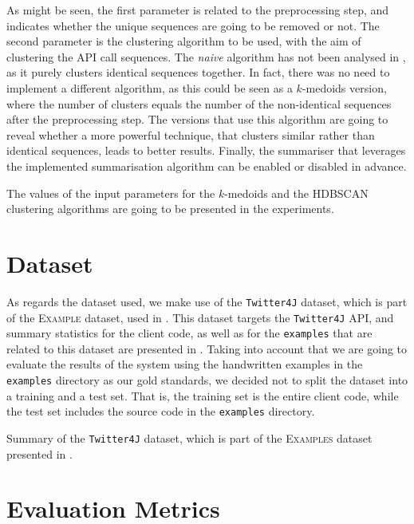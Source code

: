 As might be seen, the first parameter is related to the preprocessing step, and indicates whether the unique sequences are going to be removed or not. The second parameter is the clustering algorithm to be used, with the aim of clustering the API call sequences. The \textit{naive} algorithm has not been analysed in , as it purely clusters identical sequences together. In fact, there was no need to implement a different algorithm, as this could be seen as a $k$-medoids version, where the number of clusters equals the number of the non-identical sequences after the preprocessing step. The versions that use this algorithm are going to reveal whether a more powerful technique, that clusters similar rather than identical sequences, leads to better results. Finally, the summariser that leverages the implemented summarisation algorithm can be enabled or disabled in advance.

The values of the input parameters for the $k$-medoids and the HDBSCAN clustering algorithms are going to be presented in the experiments.


\section{Dataset}
\label{sec:evaluation-dataset}

As regards the dataset used, we make use of the \texttt{Twitter4J} dataset, which is part of the \textsc{Example} dataset, used in \cite{Fowkes2:2015}. This dataset targets the \texttt{Twitter4J} API, and summary statistics for the client code, as well as for the \texttt{examples} that are related to this dataset are presented in . Taking into account that we are going to evaluate the results of the system using the handwritten examples in the \texttt{examples} directory as our gold standards, we decided not to split the dataset into a training and a test set. That is, the training set is the entire client code, while the test set includes the source code in the \texttt{examples} directory.

\begin{table}[ht]
\centering
\small
\caption[Dataset summary]{Summary of the \texttt{Twitter4J} dataset, which is part of the \textsc{Examples} dataset presented in \cite{Fowkes2:2015}.}
\label{tables:dataset-summary}

\end{table}


\section{Evaluation Metrics}
\label{sec:evaluation-metrics}

